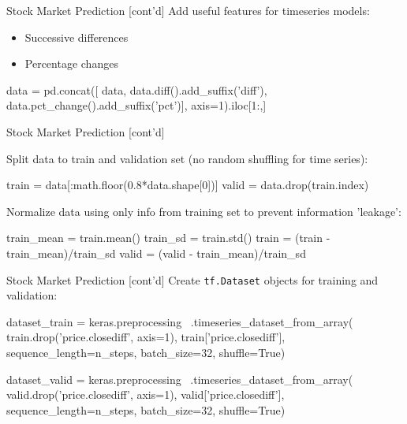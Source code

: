 \documentclass[ignorenonframetext,xcolor=x11names]{beamer}
\begin{document}
\begin{frame}[label=withcode,fragile]{Stock Market Prediction \small [cont'd]}
Add useful features for timeseries models:
\begin{itemize}
   \item Successive differences
   \item Percentage changes
\end{itemize}
\begin{pythoncode}
data = pd.concat([
    data,
    data.diff().add_suffix('diff'),
    data.pct_change().add_suffix('pct')],
    axis=1).iloc[1:,]
\end{pythoncode}
\end{frame}

\begin{frame}[label=withcode,fragile]{Stock Market Prediction \small [cont'd]}

Split data to train and validation set (no random shuffling for time series):

\begin{pythoncode}
train = data[:math.floor(0.8*data.shape[0])]
valid = data.drop(train.index)
\end{pythoncode}

Normalize data using only info from training set to prevent information 'leakage':

\begin{pythoncode}
train_mean = train.mean()
train_sd = train.std()
train = (train - train_mean)/train_sd
valid = (valid - train_mean)/train_sd
\end{pythoncode}
\end{frame}

\begin{frame}[label=withcode,fragile]{Stock Market Prediction \small [cont'd]}
Create \texttt{tf.Dataset} objects for training and validation:
\begin{pythoncode}
dataset_train = keras.preprocessing \
    .timeseries_dataset_from_array(
        train.drop('price.closediff', axis=1),
        train['price.closediff'],
        sequence_length=n_steps,
        batch_size=32,
        shuffle=True)
\end{pythoncode}

\begin{pythoncode}
dataset_valid = keras.preprocessing \
    .timeseries_dataset_from_array(
        valid.drop('price.closediff', axis=1),
        valid['price.closediff'],
        sequence_length=n_steps,
        batch_size=32,
        shuffle=True)
\end{pythoncode}
\end{frame}
\end{document}
